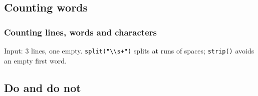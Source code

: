 \documentclass[aspectratio=169,10pt,compress]{beamer}
\begin{document}
\subsection[Count words]{Counting words}




\begin{frame}[t,fragile] \frametitle{Counting lines, words and characters}

  \vspace{0.3em}
  \small Input: 3 lines, one empty. \texttt{split("\textbackslash\textbackslash s+")} splits at runs of spaces; \texttt{strip()} avoids an empty first word.
\end{frame}


\subsection[Rules]{Do and do not}
\end{document}
